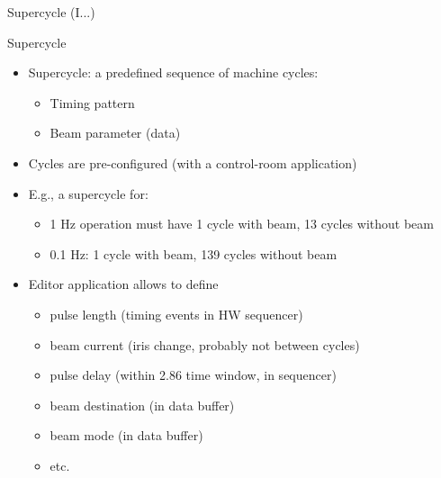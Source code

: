 \documentclass[
  9pt
  , table
  , ignorenonframetext
]{beamer}
\begin{document}
\begin{frame}{Supercycle (I...)}
  \begin{block}{Supercycle}
    \begin{itemize}
      \item Supercycle: a predefined sequence of machine cycles:
      \begin{itemize}
        \item Timing pattern
        \item Beam parameter (data)
      \end{itemize}
      \item Cycles are pre-configured (with a control-room application)
      \item E.g., a supercycle for:
      \begin{itemize}
        \item 1 Hz operation must have 1 cycle with beam, 13 cycles without beam
        \item 0.1 Hz: 1 cycle with beam,  139 cycles without beam
      \end{itemize}
      \item Editor application allows to define
      \begin{itemize}
        \item pulse length (timing events in HW sequencer)
        \item beam current (iris change, probably not between cycles)
        \item pulse delay (within 2.86 time window, in sequencer)
        \item beam destination (in data buffer)
        \item beam mode (in data buffer)
        \item etc.
      \end{itemize}
    \end{itemize}
  \end{block}
\end{frame}
\end{document}
